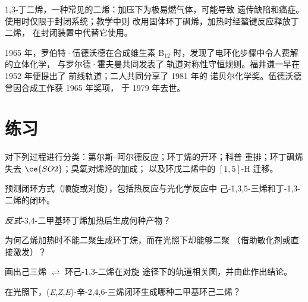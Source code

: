 \begin{safety}{}
1,3-丁二烯，一种常见的二烯：加压下为极易燃气体，可能导致
遗传缺陷和癌症。使用时仅限于封闭系统；教学中则
改用固体环丁砜烯，加热时经螯键反应释放丁二烯，
在封闭装置中代替它使用。
\end{safety}

\begin{history}[轨道对称性]
1965 年，罗伯特·伍德沃德在合成维生素 B$_{12}$ 时，发现了电环化步骤中令人费解的立体化学，
与罗尔德·霍夫曼共同发表了
轨道对称性守恒规则。福井谦一早在 1952 年便提出了
前线轨道；二人共同分享了 1981 年的
诺贝尔化学奖。伍德沃德曾因合成工作获 1965 年奖项，
于 1979 年去世。
\end{history}

\section{练习}

\begin{exercise}[$\star$]\label{exo:b3:pericyclic:1}
对下列过程进行分类：第尔斯–阿尔德反应；环丁烯的开环；科普
重排；环丁砜烯失去 $\ce{SO2}$；臭氧对烯烃的加成；
以及环戊二烯中的 $[1,5]$-H 迁移。
\end{exercise}

\begin{exercise}[$\star$]\label{exo:b3:pericyclic:2}
预测闭环方式（顺旋或对旋），包括热反应与光化学反应中
己-1,3,5-三烯和丁-1,3-二烯的闭环。
\end{exercise}

\begin{exercise}[$\star$]\label{exo:b3:pericyclic:3}
\textit{反式}-3,4-二甲基环丁烯加热后生成何种产物？
\end{exercise}

\begin{exercise}[$\star$]\label{exo:b3:pericyclic:4}
为何乙烯加热时不能二聚生成环丁烷，而在光照下却能够二聚
（借助敏化剂或直接激发）？
\end{exercise}

\begin{exercise}[$\star\star$]\label{exo:b3:pericyclic:5}
画出己三烯 $\rightleftharpoons$ 环己-1,3-二烯在对旋
途径下的轨道相关图，并由此作出结论。
\end{exercise}

\begin{exercise}[$\star\star$]\label{exo:b3:pericyclic:6}
在光照下，(\textit{E},\textit{Z},\textit{E})-辛-2,4,6-三烯闭环生成哪种二甲基环己二烯？
\end{exercise}

